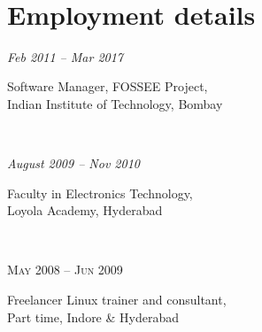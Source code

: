 \documentclass[10pt]{article} %
\begin{document}
\color{text1} %


\par{\\ %


\begin{minipage}[t]{0.5\textwidth} %
\vspace{0pt} %


\section{Employment details}

\smallskip
{\raggedright\textit{Feb 2011 -- Mar 2017}\par}
{\raggedright\large Software Manager, FOSSEE Project, \\
Indian Institute of Technology, Bombay}\\
\smallskip

{\raggedright\textit{August 2009 -- Nov 2010}\par}
{\raggedright\large Faculty in Electronics Technology, \\
Loyola Academy, Hyderabad}\\
\smallskip

{\raggedright\textsc{May 2008 -- Jun 2009}\par}
{\raggedright\large Freelancer Linux trainer and consultant, \\
Part time, Indore \& Hyderabad}\\


\end{minipage}}
\end{document}
